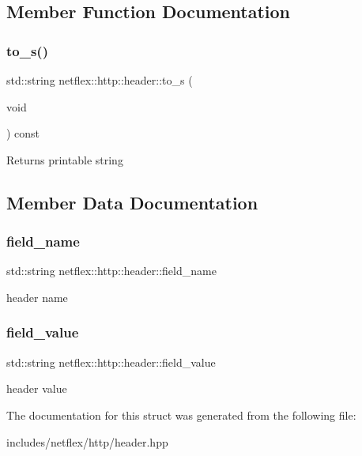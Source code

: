 \subsection{Member Function Documentation}
\mbox{\label{structnetflex_1_1http_1_1header_a6d9c1feb8881d1488b9b5793afc00579}} 
\subsubsection{\texorpdfstring{to\+\_\+s()}{to\_s()}}
{\footnotesize\ttfamily std\+::string netflex\+::http\+::header\+::to\+\_\+s (\begin{DoxyParamCaption}\item[{void}]{ }\end{DoxyParamCaption}) const}

\begin{DoxyReturn}{Returns}
printable string 
\end{DoxyReturn}


\subsection{Member Data Documentation}
\mbox{\label{structnetflex_1_1http_1_1header_ae72e56634fc6e2ec9ce4ff1bd633eaff}} 
\subsubsection{\texorpdfstring{field\+\_\+name}{field\_name}}
{\footnotesize\ttfamily std\+::string netflex\+::http\+::header\+::field\+\_\+name}

header name \mbox{\label{structnetflex_1_1http_1_1header_ab8ddd4c11c3775694f64976b5be29753}} 
\subsubsection{\texorpdfstring{field\+\_\+value}{field\_value}}
{\footnotesize\ttfamily std\+::string netflex\+::http\+::header\+::field\+\_\+value}

header value 

The documentation for this struct was generated from the following file\+:\begin{DoxyCompactItemize}
\item 
includes/netflex/http/header.\+hpp\end{DoxyCompactItemize}
